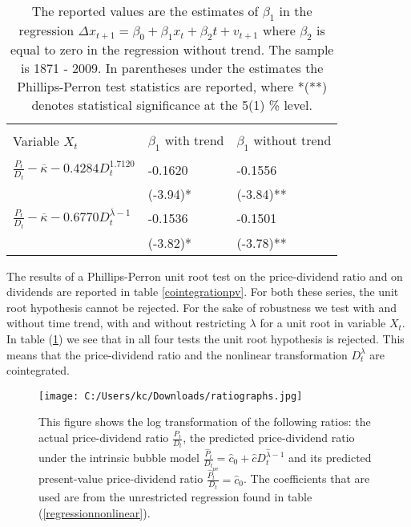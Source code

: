 \documentclass{article}
\begin{document}
\begin{table}[h!]
\centering
\begin{tabular}{l | l l }
\hline \\
Variable $X_t$ & $\beta_1$ with trend & $\beta_1$ without trend \\
\hline \\
$\frac{P_t}{D_t} - \overline{\kappa} - 0.4284 D_t^{1.7120} $ & -0.1620 & -0.1556 \\
 & (-3.94)* & (-3.84)**\\
$\frac{P_t}{D_t} - \overline{\kappa} - 0.6770 D_t^{\overline{\lambda} - 1} $ & -0.1536 & -0.1501  \\
 & (-3.82)*  & (-3.78)**\\
\hline 
\end{tabular}
\caption{The reported values are the estimates of $\beta_1$ in the regression $\Delta x_{t+1} = \beta_0 + \beta_1 x_t + \beta_2 t + v_{t+1} $ where $\beta_2$ is equal to zero in the regression without trend. The sample is 1871 - 2009. In parentheses under the estimates the Phillips-Perron test statistics are reported, where *(**) denotes statistical significance at the 5(1) \% level.}
\label{cointegrationintrinsic}
\end{table}

The results of a Phillips-Perron unit root test on the price-dividend ratio and on dividends are reported in table \ref{cointegrationpv}. For both these series, the unit root hypothesis cannot be rejected. For the sake of robustness we test with and without time trend, with and without restricting $\lambda$ for a unit root in variable $X_t$. In table (\ref{cointegrationintrinsic}) we see that in all four tests the unit root hypothesis is rejected. This means that the price-dividend ratio and the nonlinear transformation $D_t^{\lambda}$ are cointegrated. 
\\


\begin{figure}[b!]
	\centering
		\texttt{[image: C:/Users/kc/Downloads/ratiographs.jpg]}
	\caption{This figure shows the log transformation of the following ratios: the actual price-dividend ratio $\frac{P_t}{D_t}$, the predicted price-dividend ratio under the intrinsic bubble model $\frac{\widehat{P}_t}{D_t} = \widehat{c}_0 + \widehat{c}D_t^{\widehat{\lambda} - 1}$ and its predicted present-value price-dividend ratio $\frac{\widehat{P}_t^{pv}}{D_t} = \widehat{c}_0$.
	The coefficients that are used are from the unrestricted regression found in table (\ref{regressionnonlinear}).}
	\label{ratiographs}
\end{figure}
\end{document}
